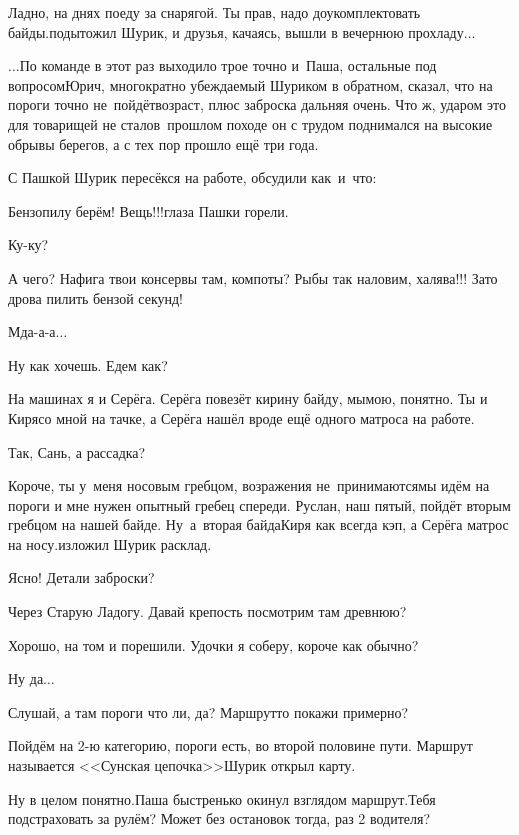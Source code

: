 \diagdash Ладно, на днях поеду за снарягой. Ты прав, надо доукомплектовать байды.\mdash подытожил Шурик, и друзья, качаясь, вышли в вечернюю прохладу$\ldots$

\vspace{0.9cm}

$\ldots$По команде в этот раз выходило трое точно и~Паша, остальные под вопросом\mdash Юрич, многократно убеждаемый Шуриком в обратном, сказал, что на пороги точно не~пойдёт\mdash возраст, плюс заброска дальняя очень. Что ж, ударом это для товарищей не стало\mdash в~прошлом походе он с трудом поднимался на высокие обрывы берегов, а с тех пор прошло ещё три года.

С Пашкой Шурик пересёкся на работе, обсудили как~и~что:

\diagdash Бензопилу берём! Вещь!!!\mdash глаза Пашки горели.

\diagdash Ку-ку?

\diagdash А чего? Нафига твои консервы там, компоты? Рыбы так наловим, халява!!! Зато дрова пилить бензой секунд!

\diagdash Мда-а-а$\ldots$

\diagdash Ну как хочешь. Едем как?

\diagdash На машинах я и Серёга. Серёга повезёт кирину байду, мы\mdash мою, понятно. Ты и Киря\mdash со мной на тачке, а Серёга нашёл вроде ещё одного матроса на работе.

\diagdash Так, Сань, а рассадка?

\diagdash Короче, ты у~меня носовым гребцом, возражения не~принимаются\mdash мы идём на пороги и мне нужен опытный гребец спереди. Руслан, наш пятый, пойдёт вторым гребцом на нашей байде. Ну~а~вторая байда\mdash Киря как всегда кэп, а Серёга матрос на носу.\mdash изложил Шурик расклад.

\diagdash Ясно! Детали заброски?

\diagdash Через Старую Ладогу. Давай крепость посмотрим там древнюю?

\diagdash Хорошо, на том и порешили. Удочки я соберу, короче как обычно?

\diagdash Ну да$\ldots$

\diagdash Слушай, а там пороги что ли, да? Маршрут\sdash то покажи примерно?

\diagdash Пойдём на 2-ю категорию, пороги есть, во второй половине пути. Маршрут называется <<Сунская цепочка>>\mdash Шурик открыл карту.

\diagdash Ну в целом понятно.\mdash Паша быстренько окинул взглядом маршрут.\mdash Тебя подстраховать за рулём? Может без остановок тогда, раз 2 водителя?

